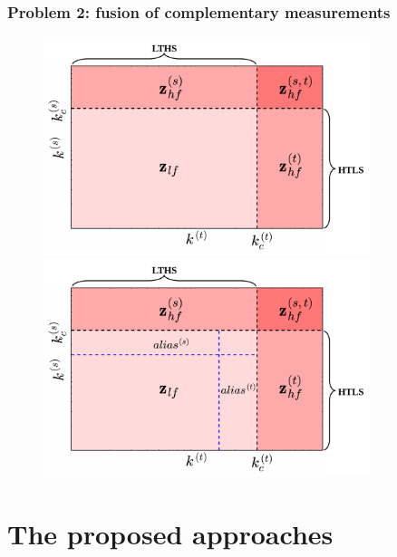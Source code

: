 \documentclass{beamer}
\begin{document}
\begin{frame}
\frametitle{Problem 2: fusion of complementary measurements}
	\begin{figure}
		\begin{overprint}
			\centerline{\includegraphics[width=0.85\textwidth]{./figures/turbulence/space_time_wavedomain_long.pdf}}
			\centerline{\includegraphics[width=0.85\textwidth]{./figures/turbulence/space_time_wavedomain_long_alias.pdf}}
		\end{overprint}			
	\end{figure}
\end{frame}



\section[Approaches]{The proposed approaches}
\end{document}

